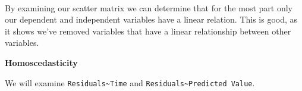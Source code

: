 \documentclass[10pt]{article}\usepackage[]{graphicx}\usepackage[]{xcolor}
\begin{document}
    \begin{center}
    \end{center}
    { \hspace*{\fill} \\}
    
    By examining our scatter matrix we can determine that for the most part
only our dependent and independent variables have a linear relation.
This is good, as it shows we've removed variables that have a linear
relationship between other variables.

\textbf{Homoscedasticity}

We will examine \texttt{Residuals\textasciitilde{}Time} and
\texttt{Residuals\textasciitilde{}Predicted Value}.
\end{document}

